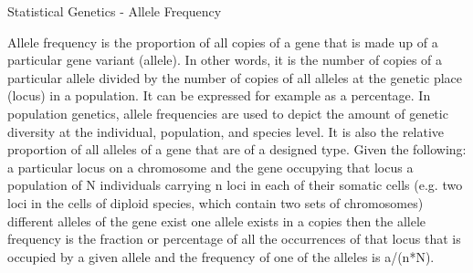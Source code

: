  
Statistical Genetics - Allele Frequency
 
Allele frequency is the proportion of all copies of a gene that is made up of a particular gene variant (allele). In other words, it is the number of copies of a particular allele divided by the number of copies of all alleles at the genetic place (locus) in a population. It can be expressed for example as a percentage. In population genetics, allele frequencies are used to depict the amount of genetic diversity at the individual, population, and species level. It is also the relative proportion of all alleles of a gene that are of a designed type.
Given the following:
a particular locus on a chromosome and the gene occupying that locus
a population of N individuals carrying n loci in each of their somatic cells (e.g. two loci in the cells of diploid species, which contain two sets of chromosomes)
different alleles of the gene exist
one allele exists in a copies
then the allele frequency is the fraction or percentage of all the occurrences of that locus that is occupied by a given allele and the frequency of one of the alleles is a/(n*N).


